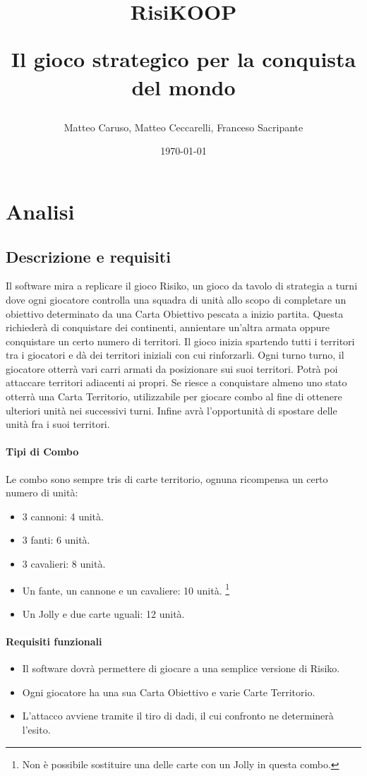 \documentclass[a4paper,12pt]{report}
\title{
RisiKOOP \\
\begin{large}
Il gioco strategico per la conquista del mondo
\end{large}
}
\author{Matteo Caruso, Matteo Ceccarelli, Franceso Sacripante}
\date{\today}
\begin{document}
\maketitle

\tableofcontents

\chapter{Analisi}

\section{Descrizione e requisiti}

Il software mira a replicare il gioco Risiko, un gioco da tavolo di strategia a turni dove ogni giocatore controlla una squadra di unità allo scopo di completare un obiettivo determinato da una Carta Obiettivo pescata a inizio partita.
Questa richiederà di conquistare dei continenti, annientare un'altra armata oppure conquistare un certo numero di territori.
Il gioco inizia spartendo tutti i territori tra i giocatori e dà dei territori iniziali con cui rinforzarli.
Ogni turno turno, il giocatore otterrà vari carri armati da posizionare sui suoi territori.
Potrà poi attaccare territori adiacenti ai propri.
Se riesce a conquistare almeno uno stato otterrà una Carta Territorio, utilizzabile per giocare combo al fine di ottenere ulteriori unità nei successivi turni.
Infine avrà l'opportunità di spostare delle unità fra i suoi territori.

\subsubsection{Tipi di Combo}
Le combo sono sempre tris di carte territorio, ognuna ricompensa un certo numero di unità:
\begin{itemize}
	\item 3 cannoni: 4 unità.
	\item 3 fanti: 6 unità.
	\item 3 cavalieri: 8 unità.
	\item Un fante, un cannone e un cavaliere: 10 unità. \footnote{\label{note1}Non è possibile sostituire una delle carte con un Jolly in questa combo.}
	\item Un Jolly e due carte uguali: 12 unità.
\end{itemize}

\subsubsection{Requisiti funzionali}
\begin{itemize}
	\item Il software dovrà permettere di giocare a una semplice versione di Risiko.
	\item Ogni giocatore ha una sua Carta Obiettivo e varie Carte Territorio.
	\item L'attacco avviene tramite il tiro di dadi, il cui confronto ne determinerà l'esito.
\end{itemize}
\end{document}

